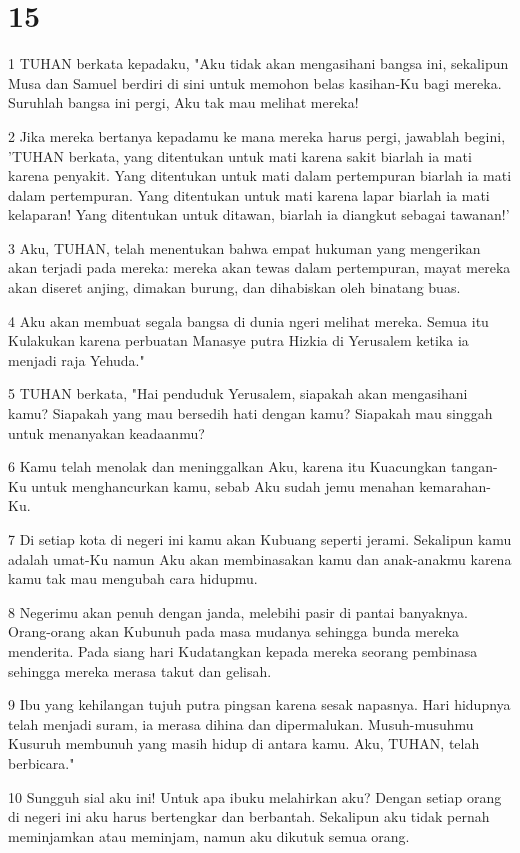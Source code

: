 \chapter{15}

\par 1 TUHAN berkata kepadaku, "Aku tidak akan mengasihani bangsa ini, sekalipun Musa dan Samuel berdiri di sini untuk memohon belas kasihan-Ku bagi mereka. Suruhlah bangsa ini pergi, Aku tak mau melihat mereka!
\par 2 Jika mereka bertanya kepadamu ke mana mereka harus pergi, jawablah begini, 'TUHAN berkata, yang ditentukan untuk mati karena sakit biarlah ia mati karena penyakit. Yang ditentukan untuk mati dalam pertempuran biarlah ia mati dalam pertempuran. Yang ditentukan untuk mati karena lapar biarlah ia mati kelaparan! Yang ditentukan untuk ditawan, biarlah ia diangkut sebagai tawanan!'
\par 3 Aku, TUHAN, telah menentukan bahwa empat hukuman yang mengerikan akan terjadi pada mereka: mereka akan tewas dalam pertempuran, mayat mereka akan diseret anjing, dimakan burung, dan dihabiskan oleh binatang buas.
\par 4 Aku akan membuat segala bangsa di dunia ngeri melihat mereka. Semua itu Kulakukan karena perbuatan Manasye putra Hizkia di Yerusalem ketika ia menjadi raja Yehuda."
\par 5 TUHAN berkata, "Hai penduduk Yerusalem, siapakah akan mengasihani kamu? Siapakah yang mau bersedih hati dengan kamu? Siapakah mau singgah untuk menanyakan keadaanmu?
\par 6 Kamu telah menolak dan meninggalkan Aku, karena itu Kuacungkan tangan-Ku untuk menghancurkan kamu, sebab Aku sudah jemu menahan kemarahan-Ku.
\par 7 Di setiap kota di negeri ini kamu akan Kubuang seperti jerami. Sekalipun kamu adalah umat-Ku namun Aku akan membinasakan kamu dan anak-anakmu karena kamu tak mau mengubah cara hidupmu.
\par 8 Negerimu akan penuh dengan janda, melebihi pasir di pantai banyaknya. Orang-orang akan Kubunuh pada masa mudanya sehingga bunda mereka menderita. Pada siang hari Kudatangkan kepada mereka seorang pembinasa sehingga mereka merasa takut dan gelisah.
\par 9 Ibu yang kehilangan tujuh putra pingsan karena sesak napasnya. Hari hidupnya telah menjadi suram, ia merasa dihina dan dipermalukan. Musuh-musuhmu Kusuruh membunuh yang masih hidup di antara kamu. Aku, TUHAN, telah berbicara."
\par 10 Sungguh sial aku ini! Untuk apa ibuku melahirkan aku? Dengan setiap orang di negeri ini aku harus bertengkar dan berbantah. Sekalipun aku tidak pernah meminjamkan atau meminjam, namun aku dikutuk semua orang.
